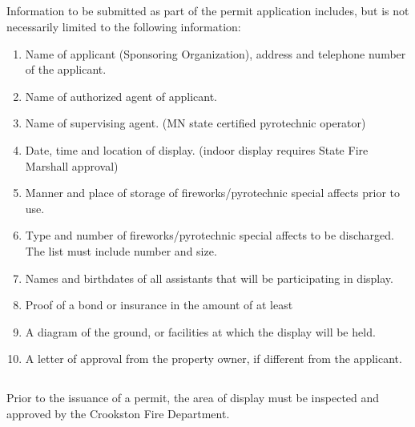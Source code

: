 \subsection{}
Information to be submitted as part of the permit application includes, but is not necessarily limited to the following information:
\begin{enumerate}[{\indent}1)]
    \item Name of applicant (Sponsoring Organization), address and telephone number of the applicant. 
    \item Name of authorized agent of applicant. 
    \item Name of supervising agent. (MN state certified pyrotechnic operator) 
    \item Date, time and location of display. (indoor display requires State Fire Marshall approval) 
    \item Manner and place of storage of fireworks/pyrotechnic special affects prior to use. 
    \item Type and number of fireworks/pyrotechnic special affects to be discharged.  The list must include number and size. 
    \item Names and birthdates of all assistants that will be participating in display. 
    \item Proof of a bond or insurance in the amount of at least 
    \item A diagram of the ground, or facilities at which the display will be held. 
    \item A letter of approval from the property owner, if different from the applicant. 
\end{enumerate}
\subsection{}
Prior to the issuance of a permit, the area of display must be inspected and approved by the Crookston Fire Department.

